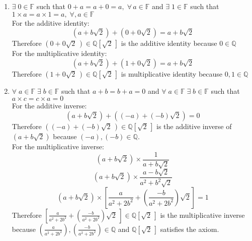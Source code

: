 \documentclass[letterpaper,12pt]{article}
\begin{document}
\begin{spacing}{1.5}
\begin{enumerate}
\begin{enumerate}[(F 1)]
\item $\exists\; 0 \in \mathbb{F}$ such that $ 0 + a = a + 0 =
  a,\;\forall\, a \in \mathbb{F}$ and $\exists\; 1 \in \mathbb{F}$ such
  that $1\times a = a \times 1 = a,\;\forall, a \in \mathbb{F}$
\\
For the additive identity:
\begin{equation}
\left(a + b\sqrt{2}\right) + \left(0 + 0\sqrt{2}\right)= a + b\sqrt{2}
\end{equation}
Therefore $\left(0 + 0\sqrt{2}\,\right) \in
\mathbb{Q}\left[\sqrt{2}\,\right]$ is the additive identity because $0 \in \mathbb{Q}$
\\
For the multiplicative identity:
\begin{equation}
\left(a+b\sqrt{2}\right) + \left(1 +0\sqrt{2}\right) = a + b\sqrt{2}
\end{equation}
Therefore $\left(1 + 0\sqrt{2}\,\right) \in
\mathbb{Q}\left[\sqrt{2}\,\right]$ is multiplicative identity because
$0,1 \in \mathbb{Q}$
\item $\forall\; a \in \mathbb{F}\; \exists\; b \in \mathbb{F}$ such that
$a+b=b+a=0$ and $ \forall\; a \in  \mathbb{F}\; \exists\; b \in
\mathbb{F}$ such that $a \times c = c\times a = 0$
\\
For the additive inverse:
\begin{equation}
\left(a+b\sqrt{2}\right)+\left(\left(-a\right) + \left(-b\right)\sqrt{2}\right)=0
\end{equation}
Therefore $\left(\left(-a\right) + \left(-b\right)\sqrt{2}\,\right)\in \mathbb{Q}\left[\sqrt{2}\,\right]$ is
the additive inverse of $\left(a+b\sqrt{2}\right)$ because $(-a),(-b)
\in \mathbb{Q}$.\\
For the multiplicative inverse:
\begin{equation}
\left(a+b\sqrt{2}\right)\times\frac{1}{a+b\sqrt{2}}
\end{equation}
\begin{equation}
\left(a+b\sqrt{2}\right)\times\frac{a-b\sqrt{2}}{a^2+b^2 \sqrt{2}}
\end{equation}
\begin{equation}
\left(a+b\sqrt{2}\right)\times\left[\frac{a}{a^2+2b^2}+\left(\frac{-b}{a^2+2b^2}\right)\sqrt{2}\right]=1
\end{equation}
Therefore
$\left[\frac{a}{a^2+2b^2}+\left(\frac{-b}{a^2+2b^2}\right)\sqrt{2}\,\right]
\in \mathbb{Q}\left[\sqrt{2}\,\right]$ is the multiplicative inverse
because $\left(\frac{a}{a^2+2b^2}\right),
\left(\frac{-b}{a^2+2b^2}\right) \in \mathbb{Q}$ and
$\mathbb{Q}\left[\sqrt{2}\,\right]$ satisfies the axiom.

\end{enumerate}
\end{enumerate}
\end{spacing}
\end{document}
